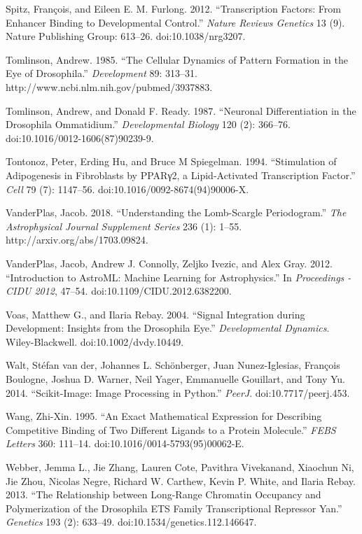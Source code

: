 Spitz, François, and Eileen E. M. Furlong. 2012. ``Transcription Factors: From Enhancer Binding to Developmental Control.'' \emph{Nature Reviews Genetics} 13 (9). Nature Publishing Group: 613--26. doi:10.1038/nrg3207.

Tomlinson, Andrew. 1985. ``The Cellular Dynamics of Pattern Formation in the Eye of Drosophila.'' \emph{Development} 89: 313--31. http://www.ncbi.nlm.nih.gov/pubmed/3937883.

Tomlinson, Andrew, and Donald F. Ready. 1987. ``Neuronal Differentiation in the Drosophila Ommatidium.'' \emph{Developmental Biology} 120 (2): 366--76. doi:10.1016/0012-1606(87)90239-9.

Tontonoz, Peter, Erding Hu, and Bruce M Spiegelman. 1994. ``Stimulation of Adipogenesis in Fibroblasts by PPARγ2, a Lipid-Activated Transcription Factor.'' \emph{Cell} 79 (7): 1147--56. doi:10.1016/0092-8674(94)90006-X.

VanderPlas, Jacob. 2018. ``Understanding the Lomb-Scargle Periodogram.'' \emph{The Astrophysical Journal Supplement Series} 236 (1): 1--55. http://arxiv.org/abs/1703.09824.

VanderPlas, Jacob, Andrew J. Connolly, Zeljko Ivezic, and Alex Gray. 2012. ``Introduction to AstroML: Machine Learning for Astrophysics.'' In \emph{Proceedings - CIDU 2012}, 47--54. doi:10.1109/CIDU.2012.6382200.

Voas, Matthew G., and Ilaria Rebay. 2004. ``Signal Integration during Development: Insights from the Drosophila Eye.'' \emph{Developmental Dynamics}. Wiley-Blackwell. doi:10.1002/dvdy.10449.

Walt, Stéfan van der, Johannes L. Schönberger, Juan Nunez-Iglesias, François Boulogne, Joshua D. Warner, Neil Yager, Emmanuelle Gouillart, and Tony Yu. 2014. ``Scikit-Image: Image Processing in Python.'' \emph{PeerJ}. doi:10.7717/peerj.453.

Wang, Zhi-Xin. 1995. ``An Exact Mathematical Expression for Describing Competitive Binding of Two Different Ligands to a Protein Molecule.'' \emph{FEBS Letters} 360: 111--14. doi:10.1016/0014-5793(95)00062-E.

Webber, Jemma L., Jie Zhang, Lauren Cote, Pavithra Vivekanand, Xiaochun Ni, Jie Zhou, Nicolas Negre, Richard W. Carthew, Kevin P. White, and Ilaria Rebay. 2013. ``The Relationship between Long-Range Chromatin Occupancy and Polymerization of the Drosophila ETS Family Transcriptional Repressor Yan.'' \emph{Genetics} 193 (2): 633--49. doi:10.1534/genetics.112.146647.

